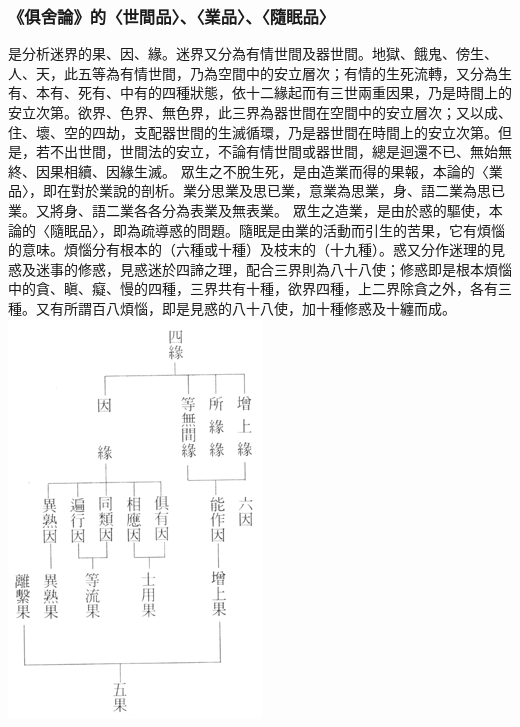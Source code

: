 \subsubsection{《俱舍論》的〈世間品〉、〈業品〉、〈隨眠品〉}
是分析迷界的果、因、緣。迷界又分為有情世間及器世間。地獄、餓鬼、傍生、人、天，此五等為有情世間，乃為空間中的安立層次；有情的生死流轉，又分為生有、本有、死有、中有的四種狀態，依十二緣起而有三世兩重因果，乃是時間上的安立次第。欲界、色界、無色界，此三界為器世間在空間中的安立層次；又以成、住、壞、空的四劫，支配器世間的生滅循環，乃是器世間在時間上的安立次第。但是，若不出世間，世間法的安立，不論有情世間或器世間，總是迴還不已、無始無終、因果相續、因緣生滅。
眾生之不脫生死，是由造業而得的果報，本論的〈業品〉，即在對於業說的剖析。業分思業及思已業，意業為思業，身、語二業為思已業。又將身、語二業各各分為表業及無表業。
眾生之造業，是由於惑的驅使，本論的〈隨眠品〉，即為疏導惑的問題。隨眠是由業的活動而引生的苦果，它有煩惱的意味。煩惱分有根本的（六種或十種）及枝末的（十九種）。惑又分作迷理的見惑及迷事的修惑，見惑迷於四諦之理，配合三界則為八十八使；修惑即是根本煩惱中的貪、瞋、癡、慢的四種，三界共有十種，欲界四種，上二界除貪之外，各有三種。又有所謂百八煩惱，即是見惑的八十八使，加十種修惑及十纏而成。
\includegraphics[scale=0.5]{释家/images/俱舍因缘论.png}
